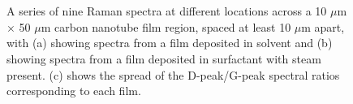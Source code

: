 \documentclass[
  a4paper,
]{scrbook}
\begin{document}
\begin{figure}
\begin{minipage}[t]{0.47\linewidth}
{{}

}

\subcaption{\label{fig-surfactant-deposited}}
\end{minipage}%
\newline
\begin{minipage}[t]{0.33\linewidth}

{\centering 

~

}

\end{minipage}%
%
\begin{minipage}[t]{0.35\linewidth}

{\centering 


}

\subcaption{\label{fig-dg-peak-comparison}}
\end{minipage}%
%
\begin{minipage}[t]{0.33\linewidth}

{\centering 

~

}

\end{minipage}%

\caption{\label{fig-pristine-raman}A series of nine Raman spectra at
different locations across a 10 \(\mu\)m \(\times\) 50 \(\mu\)m carbon
nanotube film region, spaced at least 10 \(\mu\)m apart, with (a)
showing spectra from a film deposited in solvent and (b) showing spectra
from a film deposited in surfactant with steam present. (c) shows the
spread of the D-peak/G-peak spectral ratios corresponding to each film.}

\end{figure}
\end{document}
